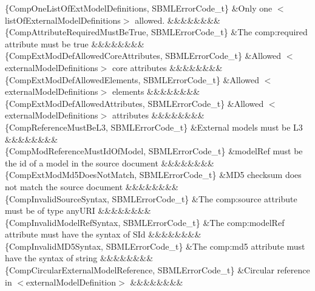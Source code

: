\begin{DoxyParagraph}{}
\begin{longtabu}
\{Comp\+One\+List\+Of\+Ext\+Model\+Definitions, S\+B\+M\+L\+Error\+Code\+\_\+t\} &Only one {\ttfamily $<$list\+Of\+External\+Model\+Definitions$>$} allowed. &&&&&&&&\\
\{Comp\+Attribute\+Required\+Must\+Be\+True, S\+B\+M\+L\+Error\+Code\+\_\+t\} &The comp\+:required attribute must be \textquotesingle{}true\textquotesingle{} &&&&&&&&\\
\{Comp\+Ext\+Mod\+Def\+Allowed\+Core\+Attributes, S\+B\+M\+L\+Error\+Code\+\_\+t\} &Allowed {\ttfamily $<$external\+Model\+Definitions$>$} core attributes &&&&&&&&\\
\{Comp\+Ext\+Mod\+Def\+Allowed\+Elements, S\+B\+M\+L\+Error\+Code\+\_\+t\} &Allowed {\ttfamily $<$external\+Model\+Definitions$>$} elements &&&&&&&&\\
\{Comp\+Ext\+Mod\+Def\+Allowed\+Attributes, S\+B\+M\+L\+Error\+Code\+\_\+t\} &Allowed {\ttfamily $<$external\+Model\+Definitions$>$} attributes &&&&&&&&\\
\{Comp\+Reference\+Must\+Be\+L3, S\+B\+M\+L\+Error\+Code\+\_\+t\} &External models must be L3 &&&&&&&&\\
\{Comp\+Mod\+Reference\+Must\+Id\+Of\+Model, S\+B\+M\+L\+Error\+Code\+\_\+t\} &\textquotesingle{}model\+Ref\textquotesingle{} must be the \textquotesingle{}id\textquotesingle{} of a model in the \textquotesingle{}source\textquotesingle{} document &&&&&&&&\\
\{Comp\+Ext\+Mod\+Md5\+Does\+Not\+Match, S\+B\+M\+L\+Error\+Code\+\_\+t\} &M\+D5 checksum does not match the \textquotesingle{}source\textquotesingle{} document &&&&&&&&\\
\{Comp\+Invalid\+Source\+Syntax, S\+B\+M\+L\+Error\+Code\+\_\+t\} &The \textquotesingle{}comp\+:source\textquotesingle{} attribute must be of type \textquotesingle{}any\+U\+RI\textquotesingle{} &&&&&&&&\\
\{Comp\+Invalid\+Model\+Ref\+Syntax, S\+B\+M\+L\+Error\+Code\+\_\+t\} &The \textquotesingle{}comp\+:model\+Ref\textquotesingle{} attribute must have the syntax of \textquotesingle{}S\+Id\textquotesingle{} &&&&&&&&\\
\{Comp\+Invalid\+M\+D5\+Syntax, S\+B\+M\+L\+Error\+Code\+\_\+t\} &The \textquotesingle{}comp\+:md5\textquotesingle{} attribute must have the syntax of \textquotesingle{}string\textquotesingle{} &&&&&&&&\\
\{Comp\+Circular\+External\+Model\+Reference, S\+B\+M\+L\+Error\+Code\+\_\+t\} &Circular reference in {\ttfamily $<$external\+Model\+Definition$>$} &&&&&&&&\\

\end{longtabu}
\end{DoxyParagraph}
